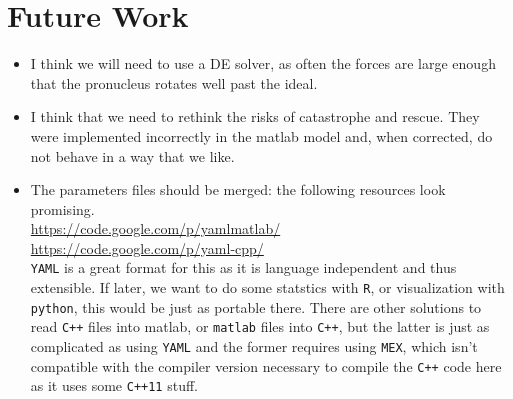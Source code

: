 \documentclass{article}
\begin{document}
\section{Future Work}
\begin{itemize}
  \item I think we will need to use a DE solver, as often the forces are large
    enough that the pronucleus rotates well past the ideal. 
  \item I think that we need to rethink the risks of catastrophe and rescue.
    They were implemented incorrectly in the matlab model and, when corrected,
    do not behave in a way that we like. 
  \item The parameters files should be merged: the following resources look
    promising. \\
    \url{https://code.google.com/p/yamlmatlab/}\\
    \url{https://code.google.com/p/yaml-cpp/}\\
    \texttt{YAML} is a great format for this as it is language independent and
    thus extensible. If later, we want to do some statstics with \texttt{R}, or
    visualization with \texttt{python}, this would be just as portable there.
    There are other solutions to read \texttt{C++} files into matlab, or
    \texttt{matlab} files into \texttt{C++}, but the latter is just as
    complicated as using \texttt{YAML} and the former requires using
    \texttt{MEX}, which isn't compatible with the compiler version necessary to
    compile the \texttt{C++} code here as it uses some \texttt{C++11} stuff. 
\end{itemize}
\end{document}
